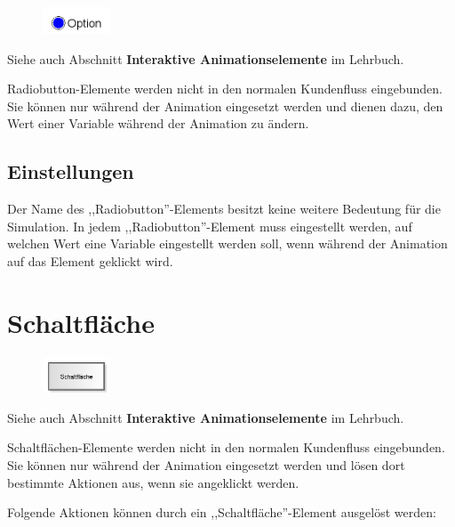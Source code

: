 \begin{figure}
\vspace{-22pt}
\includegraphics[width=2cm]{imageModelElementInteractiveRadiobutton.png}
\vspace{-22pt}
\end{figure}

Siehe auch Abschnitt \textbf{Interaktive Animationselemente} im Lehrbuch.

Radiobutton-Elemente werden nicht in den normalen Kundenfluss eingebunden.
Sie können nur während der Animation eingesetzt werden und dienen dazu,
den Wert einer Variable während der Animation zu ändern.

\subsection*{Einstellungen}

Der Name des ,,Radiobutton''-Elements besitzt keine weitere Bedeutung für die Simulation.
In jedem ,,Radiobutton''-Element muss eingestellt werden, auf welchen Wert eine Variable
eingestellt werden soll, wenn während der Animation auf das Element geklickt wird.


\section{Schaltfläche}
\label{ref:ModelElementInteractiveButton}

\begin{figure}
\vspace{-22pt}
\includegraphics[width=2cm]{imageModelElementInteractiveButton.png}
\vspace{-22pt}
\end{figure}

Siehe auch Abschnitt \textbf{Interaktive Animationselemente} im Lehrbuch.

Schaltflächen-Elemente werden nicht in den normalen Kundenfluss eingebunden.
Sie können nur während der Animation eingesetzt werden und lösen dort bestimmte
Aktionen aus, wenn sie angeklickt werden.

Folgende Aktionen können durch ein ,,Schaltfläche''-Element ausgelöst werden:

